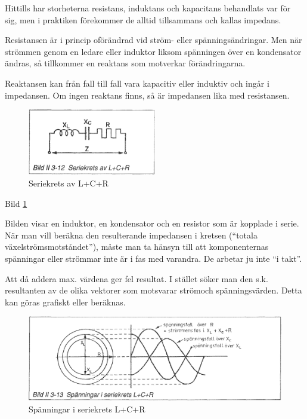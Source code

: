Hittills har storheterna resistans, induktans och kapacitans behandlats var för
sig, men i praktiken förekommer de alltid tillsammans och kallas impedans.

Resistansen är i princip oförändrad vid ström- eller spänningsändringar. Men när
strömmen genom en ledare eller induktor liksom spänningen över en kondensator
ändras, så tillkommer en reaktans som motverkar förändringarna.

Reaktansen kan från fall till fall vara kapacitiv eller induktiv och ingår i
impedansen. Om ingen reaktans finns, så är impedansen lika med resistansen.

\begin{figure}
\includegraphics[width=0.5\textwidth]{images/bild_2_3-12}
\caption{Seriekrets av L+C+R}
\label{fig:BildII3-12}
\end{figure}

Bild \ref{fig:BildII3-12}

Bilden visar en induktor, en kondensator och en resistor som är kopplade i
serie. När man vill beräkna den resulterande impedansen i kretsen
(``totala växelströmsmotståndet''), måste man ta hänsyn till att komponenternas
spänningar eller strömmar inte är i fas med varandra. De arbetar ju inte
``i takt''.

Att då addera max. värdena ger fel resultat. I stället söker man den s.k.
resultanten av de olika vektorer som motsvarar strömoch spänningsvärden.
Detta kan göras grafiskt eller beräknas.

\begin{figure}
\includegraphics[width=\textwidth]{images/bild_2_3-13}
\caption{Spänningar i seriekrets L+C+R}
\label{fig:BildII3-13}
\end{figure}

